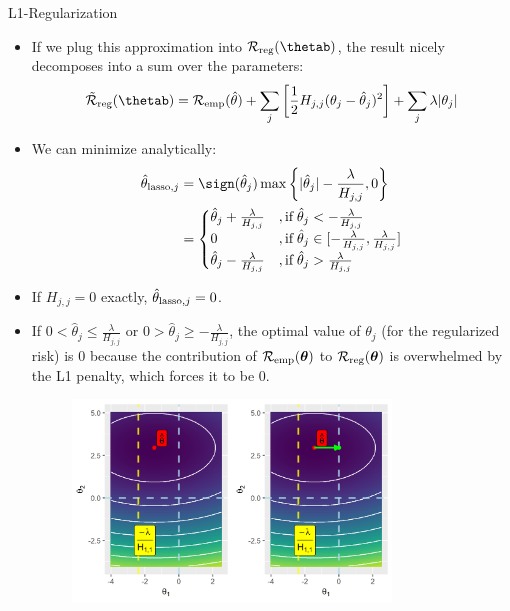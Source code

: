 \documentclass[11pt,compress,t,notes=noshow, xcolor=table]{beamer}
\begin{document}
\begin{vbframe} {L1-Regularization}
  \begin{itemize}
    \item If we plug this approximation into $\mathcal{R}_{\text{reg}}(\thetab)$, the result nicely decomposes into a sum over the parameters:
  $$\mathcal{\tilde R}_{\text{reg}}(\thetab) = \mathcal{R}_{\text{emp}}(\thetah) + \sum_j \left[ \frac{1}{2} H_{j,j} (\theta_j - \hat{\theta}_j)^2 \right] + \sum_j \lambda |\theta_j|$$
    \item We can minimize analytically:
     \begin{align*}\hat{\theta}_{\text{lasso},j} &= \sign(\hat{\theta}_j) \max \left\{ |\hat{\theta}_j| - \frac{\lambda}{H_{j,j}},0 \right\} \\
     &= \begin{cases} 
     \hat{\theta}_j + \frac{\lambda}{H_{j,j}} &, \text{if}   \;\hat{\theta}_j < -\frac{\lambda}{H_{j,j}} \\
       0 &, \text{if}   \;\hat{\theta}_j \in [-\frac{\lambda}{H_{j,j}}, \frac{\lambda}{H_{j,j}}] \\
     \hat{\theta}_j - \frac{\lambda}{H_{j,j}} &, \text{if}   \;\hat{\theta}_j > \frac{\lambda}{H_{j,j}} \\
     \end{cases}
     \end{align*}
  \item If $H_{j,j} = 0$ exactly, $\hat{\theta}_{\text{lasso},j} = 0$.

\framebreak

\item If  $0 < \hat{\theta}_j \leq \frac{\lambda}{H_{j,j}}$ or $0 > \hat{\theta}_j \geq -\frac{\lambda}{H_{j,j}}$, the optimal value of $\theta_j$ (for the regularized risk) is $0$ because the contribution of  $\mathcal{R}_{\text{emp}}(\bm{\theta})$ to $\mathcal{R}_{\text{reg}}(\bm{\theta})$ is overwhelmed by the L1 penalty, which forces it to be $0$.

\begin{figure}
\includegraphics[width=0.8\textwidth]{figure/l1_reg_hess_01.png}\\
\end{figure}


\end{itemize}
\end{vbframe}
\end{document}
